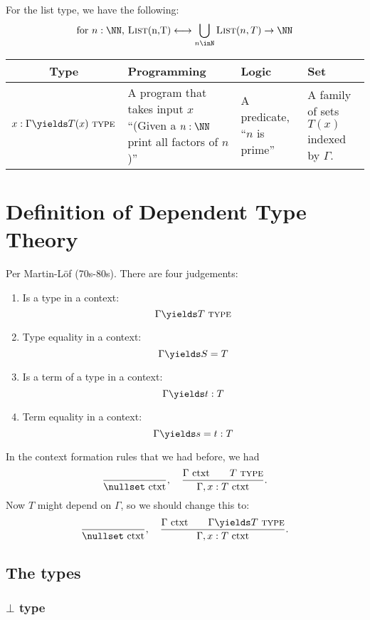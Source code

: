 \documentclass{article}
\newcommand\TYPE{\text{ \scshape{type}}}
\newcommand\ctxt{\text{ ctxt}}
\newcommand\List{\textsc{List}}
\begin{document}
\begin{example}
    For the list type, we have the following:
    \[ \text{for $n:\NN$, \List(n,T)}
    \longleftrightarrow 
    \bigcup_{n\inN} \List(n,T) \to \NN
    \]
\end{example}

\begin{table}
    \centering
    \begin{tabular}{cp{4cm}p{4cm}p{4cm}}
        Type & Programming & Logic & Set \\
        \toprule
        $x:\Gamma \yields T(x) \TYPE $
        &
        A program that takes input $x$
        ``(Given a $n:\NN$ print all factors of $n$)''
        &
        A predicate, ``$n$ is prime''
        &
        A family of sets $T(x)$ indexed by
        $\Gamma$.
        \\
    \end{tabular}
\end{table}

\section{Definition of Dependent Type Theory}

Per Martin-L\"of (70s-80s). There are four judgements:
\begin{enumerate}
    \item Is a type in a context: \[ \Gamma \yields T\TYPE \]
    \item Type equality in a context: \[ \Gamma \yields S=T \]
    \item Is a term of a type in a context: \[ \Gamma\yields t:T \]
    \item Term equality in a context: \[ \Gamma \yields s=t:T \]
\end{enumerate}

In the context formation rules that we had before, we had 
\[\frac{}{\nullset\ctxt},\quad
\frac{\Gamma \ctxt\qquad T\TYPE}{\Gamma,x:T\ctxt}.\]
Now $T$ might depend on $\Gamma$, so we should change this to:
\[\frac{}{\nullset\ctxt},\quad
\frac{\Gamma \ctxt\qquad \Gamma\yields T\TYPE}{\Gamma,x:T\ctxt}.\]

\subsection{The types}
\subsubsection{$\bot$ type}
\end{document}
